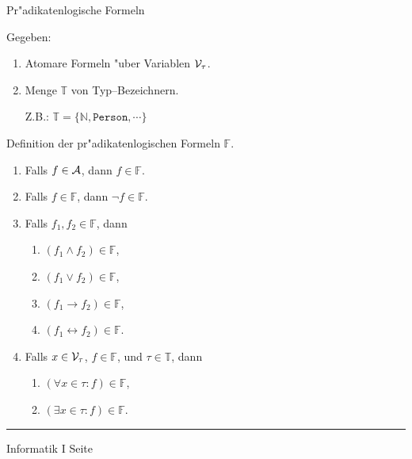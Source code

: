 
\begin{slide}{}
\normalsize
\begin{center}
Pr"adikatenlogische Formeln
\end{center}
\vspace{0.5cm}

\footnotesize
Gegeben: 
\begin{enumerate}
\item Atomare Formeln "uber Variablen ${\cal V}_\tau$.
\item Menge $\mathbb{T}$ von Typ--Bezeichnern.

      Z.B.: $\mathbb{T} = \{ \mathbb{N}, \mathtt{Person}, \cdots \}$
\end{enumerate}

Definition der pr"adikatenlogischen Formeln $\mathbb{F}$.
\begin{enumerate}
\item Falls $f \in {\cal A}$, dann $f \in \mathbb{F}$.
\item Falls $f \in \mathbb{F}$, dann $\neg f \in \mathbb{F}$.
\item Falls $f_1, f_2 \in \mathbb{F}$, dann
  \begin{enumerate}
  \item $(f_1 \wedge f_2) \in \mathbb{F}$,
  \item $(f_1 \vee f_2) \in \mathbb{F}$,
  \item $(f_1 \rightarrow f_2) \in \mathbb{F}$,
  \item $(f_1 \leftrightarrow f_2) \in \mathbb{F}$.
  \end{enumerate}
\item Falls $x \in {\cal V}_\tau$, $f \in \mathbb{F}$, und $\tau \in \mathbb{T}$, dann 
  \begin{enumerate}
  \item $(\forall x \in \tau: f) \in \mathbb{F}$,
  \item $(\exists x \in \tau: f) \in \mathbb{F}$.
  \end{enumerate}
\end{enumerate}


\vspace*{\fill}
\tiny \addtocounter{mypage}{1}
\rule{15cm}{1mm}
Informatik I  \hspace*{\fill} Seite 
\end{slide}



